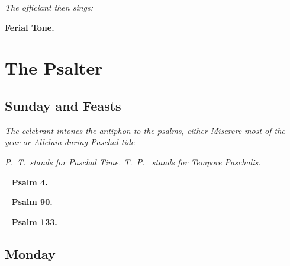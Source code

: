 \documentclass[a5paper,11pt,twoside,openany]{memoir}
\def\startParallel{}
\def\stopParallel{}
\renewcommand\Vbar{\makebox[1em][l]{\versicles v}}
\let\oldtextbf\textbf
\newcommand\rubrics[1]{\textit{#1}}
\newcommand\bibleref[2]{\oldtextbf{#1} \hfill \textit{#2}}
\newcommand\psalm[1]{~ \hfill \oldtextbf{Psalm #1.} \hfill ~}
\begin{document}

\rubrics{The officiant then sings:}


\bibleref{Ferial Tone.}{}

\gresetfirstlineaboveinitial{\Vbar}{\Vbar}

\chapter{The Psalter}

\section{Sunday and Feasts}
\label{sunday}

\rubrics{The celebrant intones the antiphon to the psalms, either \emph{Miserere} most of the year or \emph{Alleluia} during Paschal tide}


\rubrics{P.~T.~stands for Paschal Time.  T.~P.~ stands for Tempore Paschalis.}



\psalm{4}


\startParallel

\stopParallel

\psalm{90}


\startParallel

\stopParallel

\psalm{133}


\startParallel

\stopParallel




\section{Monday}
\end{document}
